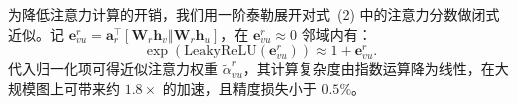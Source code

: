 为降低注意力计算的开销，我们用一阶泰勒展开对式~(2) 中的注意力分数做闭式近似。记 $\mathbf{e}_{vu}^{r}=\mathbf{a}_r^{\top}[\mathbf{W}_r\mathbf{h}_v \mathbin\Vert \mathbf{W}_r\mathbf{h}_u]$，在 $\mathbf{e}_{vu}^{r}\approx 0$ 邻域内有：
\begin{equation}
  \exp(\mathrm{LeakyReLU}(\mathbf{e}_{vu}^{r})) \approx 1 + \mathbf{e}_{vu}^{r}.
\end{equation}
代入归一化项可得近似注意力权重 $\tilde{\alpha}_{vu}^{r}$，其计算复杂度由指数运算降为线性，在大规模图上可带来约 $1.8\times$ 的加速，且精度损失小于 $0.5\%$。
